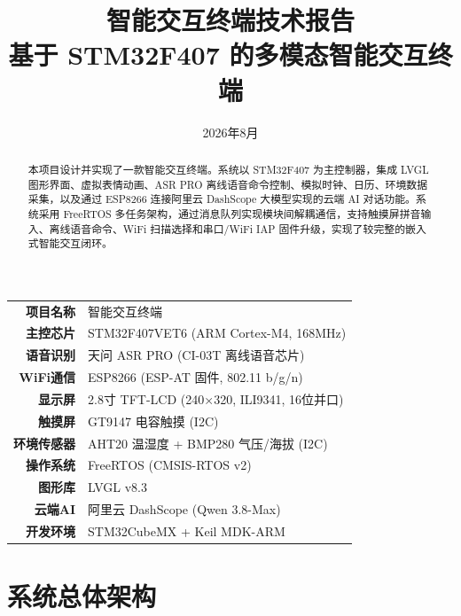 \documentclass[12pt,a4paper]{ctexart}
\title{\textbf{智能交互终端技术报告}\\
       \large 基于 STM32F407 的多模态智能交互终端}
\author{}
\date{2026年8月}
\begin{document}
\maketitle
\thispagestyle{empty}

\begin{center}
\begin{tabular}{rl}
\textbf{项目名称} & 智能交互终端 \\
\textbf{主控芯片} & STM32F407VET6 (ARM Cortex-M4, 168MHz) \\
\textbf{语音识别} & 天问 ASR PRO (CI-03T 离线语音芯片) \\
\textbf{WiFi通信}   & ESP8266 (ESP-AT 固件, 802.11 b/g/n) \\
\textbf{显示屏}     & 2.8寸 TFT-LCD (240×320, ILI9341, 16位并口) \\
\textbf{触摸屏}     & GT9147 电容触摸 (I2C) \\
\textbf{环境传感器} & AHT20 温湿度 + BMP280 气压/海拔 (I2C) \\
\textbf{操作系统}   & FreeRTOS (CMSIS-RTOS v2) \\
\textbf{图形库}     & LVGL v8.3 \\
\textbf{云端AI}     & 阿里云 DashScope (Qwen 3.8-Max) \\
\textbf{开发环境}   & STM32CubeMX + Keil MDK-ARM \\
\end{tabular}
\end{center}

\vspace{1cm}

\begin{abstract}
\noindent 本项目设计并实现了一款智能交互终端。系统以 STM32F407 为主控制器，集成 LVGL 图形界面、虚拟表情动画、ASR PRO 离线语音命令控制、模拟时钟、日历、环境数据采集，以及通过 ESP8266 连接阿里云 DashScope 大模型实现的云端 AI 对话功能。系统采用 FreeRTOS 多任务架构，通过消息队列实现模块间解耦通信，支持触摸屏拼音输入、离线语音命令、WiFi 扫描选择和串口/WiFi IAP 固件升级，实现了较完整的嵌入式智能交互闭环。
\end{abstract}

\newpage
\tableofcontents
\newpage

\section{系统总体架构}
\end{document}
